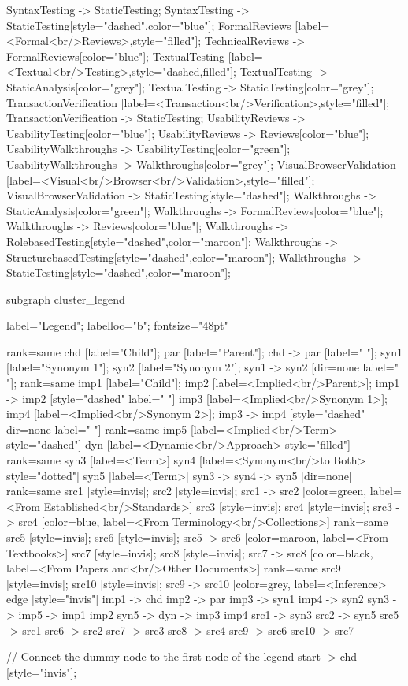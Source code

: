 \documentclass{article}
\begin{document}
{SyntaxTesting -> StaticTesting;
SyntaxTesting -> StaticTesting[style="dashed",color="blue"];
FormalReviews [label=<Formal<br/>Reviews>,style="filled"];
TechnicalReviews -> FormalReviews[color="blue"];
TextualTesting [label=<Textual<br/>Testing>,style="dashed,filled"];
TextualTesting -> StaticAnalysis[color="grey"];
TextualTesting -> StaticTesting[color="grey"];
TransactionVerification [label=<Transaction<br/>Verification>,style="filled"];
TransactionVerification -> StaticTesting;
UsabilityReviews -> UsabilityTesting[color="blue"];
UsabilityReviews -> Reviews[color="blue"];
UsabilityWalkthroughs -> UsabilityTesting[color="green"];
UsabilityWalkthroughs -> Walkthroughs[color="grey"];
VisualBrowserValidation [label=<Visual<br/>Browser<br/>Validation>,style="filled"];
VisualBrowserValidation -> StaticTesting[style="dashed"];
Walkthroughs -> StaticAnalysis[color="green"];
Walkthroughs -> FormalReviews[color="blue"];
Walkthroughs -> Reviews[color="blue"];
Walkthroughs -> RolebasedTesting[style="dashed",color="maroon"];
Walkthroughs -> StructurebasedTesting[style="dashed",color="maroon"];
Walkthroughs -> StaticTesting[style="dashed",color="maroon"];

subgraph cluster_legend {

    label="Legend";
    labelloc="b";
    fontsize="48pt"

    {
        rank=same
        chd [label="Child"];
        par [label="Parent"];
        chd -> par [label="                "];
        syn1 [label="Synonym 1"];
        syn2 [label="Synonym 2"];
        syn1 -> syn2 [dir=none label="                "];
    }
    {
        rank=same
        imp1 [label="Child"];
        imp2 [label=<Implied<br/>Parent>];
        imp1 -> imp2 [style="dashed" label="                "]
        imp3 [label=<Implied<br/>Synonym 1>];
        imp4 [label=<Implied<br/>Synonym 2>];
        imp3 -> imp4 [style="dashed" dir=none label="                "]
    }
    {
        rank=same
        imp5 [label=<Implied<br/>Term> style="dashed"]
        dyn [label=<Dynamic<br/>Approach> style="filled"]
    }
    {
        rank=same
        syn3 [label=<Term>]
        syn4 [label=<Synonym<br/>to Both> style="dotted"]
        syn5 [label=<Term>]
        syn3 -> syn4 -> syn5 [dir=none]
    }
{
rank=same
src1 [style=invis];
src2 [style=invis];
src1 -> src2 [color=green, label=<From Established<br/>Standards>]
src3 [style=invis];
src4 [style=invis];
src3 -> src4 [color=blue, label=<From Terminology<br/>Collections>]
}
{
rank=same
src5 [style=invis];
src6 [style=invis];
src5 -> src6 [color=maroon, label=<From Textbooks>]
src7 [style=invis];
src8 [style=invis];
src7 -> src8 [color=black, label=<From Papers and<br/>Other Documents>]
}
{
rank=same
src9 [style=invis];
src10 [style=invis];
src9 -> src10 [color=grey, label=<Inference>]
}
edge [style="invis"]
imp1 -> chd
imp2 -> par
imp3 -> syn1
imp4 -> syn2
syn3 -> imp5 -> { imp1 imp2 }
syn5 -> dyn -> { imp3 imp4 }
src1 -> syn3
src2 -> syn5
src5 -> src1
src6 -> src2
src7 -> src3
src8 -> src4
src9 -> src6
src10 -> src7
}

// Connect the dummy node to the first node of the legend
start -> chd [style="invis"];
}
\end{document}
